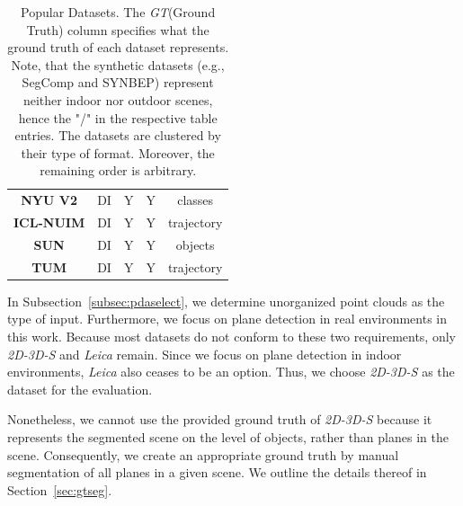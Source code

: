 \documentclass[main.tex]{subfiles}
\begin{document}
\begin{table}[H]
\begin{tabular}{c|c|c|c|c}
        \textbf{NYU V2}      \cite{10.1007/978-3-642-33715-4_54}                                                                                                                              & DI                    & Y             & Y               & classes     \\
        \textbf{ICL-NUIM}    \cite{handa:etal:ICRA2014}                                                                                                                                       & DI                    & Y             & Y               & trajectory  \\
        \textbf{SUN}         \cite{7298655}                                                                                                                                                   & DI                    & Y             & Y               & objects     \\
        \textbf{TUM}         \cite{sturm12iros}                                                                                                                                               & DI                    & Y             & Y               & trajectory
    \end{tabular}
    \caption[Popular Datasets]{Popular Datasets. The \textit{GT}(Ground Truth) column specifies what the ground truth of each dataset represents.
        Note, that the synthetic datasets (e.g., SegComp and SYNBEP) represent neither indoor nor outdoor scenes, hence the "/" in
        the respective table entries. The datasets are clustered by their type of format. Moreover, the remaining order is arbitrary.
    }
    \label{tab:datasets}
\end{table}

In Subsection~\ref{subsec:pdaselect}, we determine unorganized point clouds as the type of input. Furthermore, we focus on plane detection in real environments in this work.
Because most datasets do not conform to these two requirements, only \textit{2D-3D-S} and \textit{Leica} remain.
Since we focus on plane detection in indoor environments, \textit{Leica} also ceases to be an option.
Thus, we choose \textit{2D-3D-S} as the dataset for the evaluation.

Nonetheless, we cannot use the provided ground truth of \textit{2D-3D-S} because it represents the segmented scene on the level of objects, rather than planes in the scene.
Consequently, we create an appropriate ground truth by manual segmentation of all planes in a given scene. 
We outline the details thereof in Section~\ref{sec:gtseg}.
\end{document}
